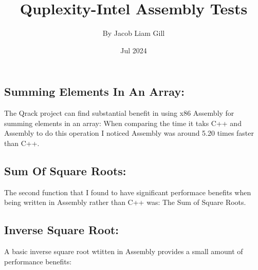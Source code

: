 \documentclass{article}
\title{Quplexity-Intel Assembly Tests}
\author{By Jacob Liam Gill}
\date{Jul 2024}
\begin{document}
\maketitle

\subsection*{Summing Elements In An Array:}
The Qrack project can find substantial benefit in using x86 Assembly for summing elements in an array: 
When comparing the time it taks C++ and Assembly to do this operation I noticed Assembly was around 5.20 times faster than C++. \\

\noindent
{}

\subsection*{Sum Of Square Roots:}
The second function that I found to have significant performace benefits when being written in Assembly rather than C++ was: The Sum of Square Roots. \\


\noindent
{}

\subsection*{Inverse Square Root:}
A basic inverse square root wtitten in Assembly provides a small amount of performance benefits: \\ \\
\noindent
{} \\\\\\\\
\end{document}
